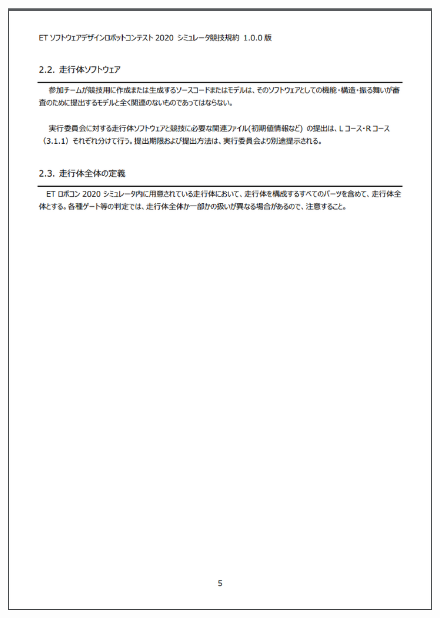 \documentclass[uplatex, report, a4j, 10pt]{jsbook}
\begin{document}
\begin{figure}[tp]
    \begin{center}
    \includegraphics[width=\hsize]{specification/ET_2.eps}
    \end{center}
\end{figure}
\end{document}
